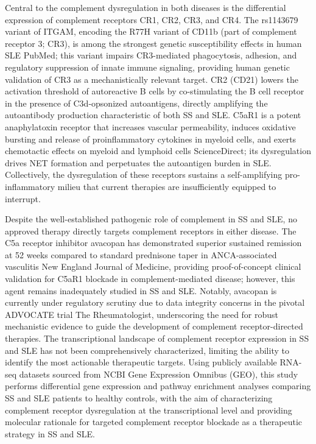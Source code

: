 \documentclass[times, twoside, watermark]{zHenriquesLab-StyleBioRxiv}
\begin{document}
	Central to the complement dysregulation in both diseases is the differential expression of complement receptors CR1, CR2, CR3, and CR4. The rs1143679 variant of ITGAM, encoding the R77H variant of CD11b (part of complement receptor 3; CR3), is among the strongest genetic susceptibility effects in human SLE PubMed; this variant impairs CR3-mediated phagocytosis, adhesion, and regulatory suppression of innate immune signaling, providing human genetic validation of CR3 as a mechanistically relevant target. CR2 (CD21) lowers the activation threshold of autoreactive B cells by co-stimulating the B cell receptor in the presence of C3d-opsonized autoantigens, directly amplifying the autoantibody production characteristic of both SS and SLE. C5aR1 is a potent anaphylatoxin receptor that increases vascular permeability, induces oxidative bursting and release of proinflammatory cytokines in myeloid cells, and exerts chemotactic effects on myeloid and lymphoid cells ScienceDirect; its dysregulation drives NET formation and perpetuates the autoantigen burden in SLE. Collectively, the dysregulation of these receptors sustains a self-amplifying pro-inflammatory milieu that current therapies are insufficiently equipped to interrupt.

	Despite the well-established pathogenic role of complement in SS and SLE, no approved therapy directly targets complement receptors in either disease. The C5a receptor inhibitor avacopan has demonstrated superior sustained remission at 52 weeks compared to standard prednisone taper in ANCA-associated vasculitis New England Journal of Medicine, providing proof-of-concept clinical validation for C5aR1 blockade in complement-mediated disease; however, this agent remains inadequately studied in SS and SLE. Notably, avacopan is currently under regulatory scrutiny due to data integrity concerns in the pivotal ADVOCATE trial The Rheumatologist, underscoring the need for robust mechanistic evidence to guide the development of complement receptor-directed therapies. The transcriptional landscape of complement receptor expression in SS and SLE has not been comprehensively characterized, limiting the ability to identify the most actionable therapeutic targets. Using publicly available RNA-seq datasets sourced from NCBI Gene Expression Omnibus (GEO), this study performs differential gene expression and pathway enrichment analyses comparing SS and SLE patients to healthy controls, with the aim of characterizing complement receptor dysregulation at the transcriptional level and providing molecular rationale for targeted complement receptor blockade as a therapeutic strategy in SS and SLE.
	
\end{document}
